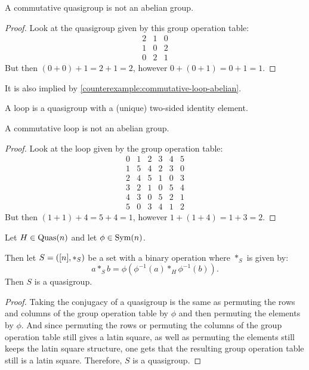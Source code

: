 \begin{counterexample}
    A commutative quasigroup is not an abelian group.
\end{counterexample}
\begin{proof}
    Look at the quasigroup given by this group operation table:
    \[
        \begin{matrix}
            2 & 1 & 0 \\
            1 & 0 & 2 \\
            0 & 2 & 1
        \end{matrix}
    \]
    But then \( (0 + 0) + 1 = 2 + 1 = 2 \), however \( 0 + (0 + 1) = 0 + 1 = 1 \).
\end{proof}
It is also implied by \autoref{counterexample:commutative-loop-abelian}.

\begin{definition} \label{def:loop}
    A loop is a quasigroup with a (unique) two-sided identity element.
\end{definition}

\begin{counterexample} \label{counterexample:commutative-loop-abelian}
    A commutative loop is not an abelian group.
\end{counterexample}
\begin{proof}
    Look at the loop given by the group operation table:
    \[
        \begin{matrix}
            0 & 1 & 2 & 3 & 4 & 5 \\
            1 & 5 & 4 & 2 & 3 & 0 \\
            2 & 4 & 5 & 1 & 0 & 3 \\
            3 & 2 & 1 & 0 & 5 & 4 \\
            4 & 3 & 0 & 5 & 2 & 1 \\
            5 & 0 & 3 & 4 & 1 & 2
        \end{matrix}
    \]
    But then \( (1 + 1) + 4 = 5 + 4 = 1 \), however \( 1 + (1 + 4) = 1 + 3 = 2 \).
\end{proof}

\begin{theorem} \label{thm:quasigroup-conjugacy}
    Let \( H \in \operatorname{Quas}(n) \) and let \( \phi \in \operatorname{Sym}(n) \).

    Then let \( S = \left( [n], *_S \right) \) be a set with a binary operation where \( *_S \) is given by:
    \[
        a *_S b = \phi(\phi^{-1}(a) *_H \phi^{-1}(b)).
    \]
    Then \( S \) is a quasigroup.
\end{theorem}
\begin{proof}
    Taking the conjugacy of a quasigroup is the same as permuting the rows and columns of the group operation table by \( \phi \) and then permuting the elements by \( \phi \). And since permuting the rows or permuting the columns of the group operation table still gives a latin square, as well as permuting the elements still keeps the latin square structure, one gets that the resulting group operation table still is a latin square. Therefore, \( S \) is a quasigroup.
\end{proof}

